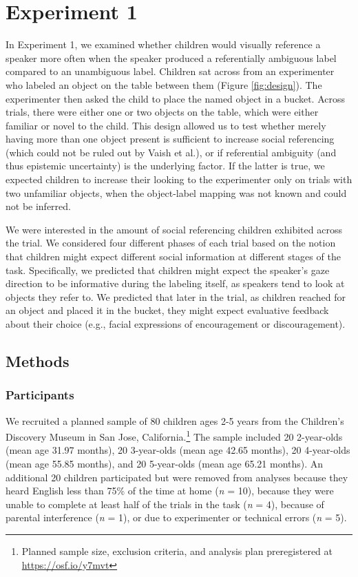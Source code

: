 \documentclass[a4paper,man,apacite,floatsintext]{apa6}
\begin{document}
\section{Experiment 1}\label{experiment-1}

In Experiment 1, we examined whether children would visually reference a
speaker more often when the speaker produced a referentially ambiguous
label compared to an unambiguous label. Children sat across from an
experimenter who labeled an object on the table between them (Figure
\ref{fig:design}). The experimenter then asked the child to place the
named object in a bucket. Across trials, there were either one or two
objects on the table, which were either familiar or novel to the child.
This design allowed us to test whether merely having more than one
object present is sufficient to increase social referencing (which could
not be ruled out by Vaish et al.), or if referential ambiguity (and thus
epistemic uncertainty) is the underlying factor. If the latter is true,
we expected children to increase their looking to the experimenter only
on trials with two unfamiliar objects, when the object-label mapping was
not known and could not be inferred.

We were interested in the amount of social referencing children
exhibited across the trial. We considered four different phases of each
trial based on the notion that children might expect different social
information at different stages of the task. Specifically, we predicted
that children might expect the speaker's gaze direction to be
informative during the labeling itself, as speakers tend to look at
objects they refer to. We predicted that later in the trial, as children
reached for an object and placed it in the bucket, they might expect
evaluative feedback about their choice (e.g., facial expressions of
encouragement or discouragement).

\subsection{Methods}\label{methods}

\subsubsection{Participants}\label{participants}

We recruited a planned sample of 80 children ages 2-5 years from the
Children's Discovery Museum in San Jose, California.\footnote{Planned
  sample size, exclusion criteria, and analysis plan preregistered at
  \url{https://osf.io/y7mvt}} The sample included 20 2-year-olds (mean
age 31.97 months), 20 3-year-olds (mean age 42.65 months), 20
4-year-olds (mean age 55.85 months), and 20 5-year-olds (mean age 65.21
months). An additional 20 children participated but were removed from
analyses because they heard English less than 75\% of the time at home
(\emph{n} = 10), because they were unable to complete at least half of
the trials in the task (\emph{n} = 4), because of parental interference
(\emph{n} = 1), or due to experimenter or technical errors (\emph{n} =
5).
\end{document}
